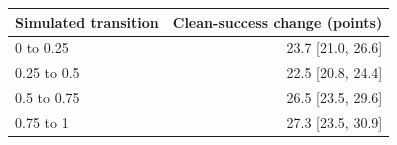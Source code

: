 \begin{tabular}{lr}\toprule
Simulated transition & Clean-success change (points) \\\midrule
0 to 0.25 & 23.7 [21.0, 26.6] \\
0.25 to 0.5 & 22.5 [20.8, 24.4] \\
0.5 to 0.75 & 26.5 [23.5, 29.6] \\
0.75 to 1 & 27.3 [23.5, 30.9] \\
\bottomrule\end{tabular}
